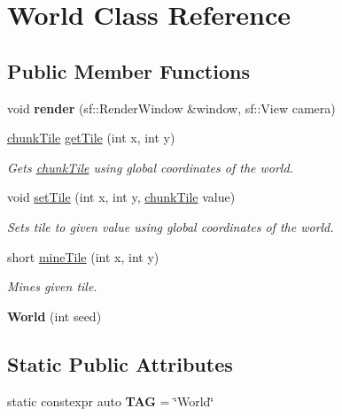 \hypertarget{classWorld}{\section{World Class Reference}
\label{classWorld}
}
\subsection*{Public Member Functions}
\begin{DoxyCompactItemize}
\item 
\hypertarget{classWorld_ad41d823a21794ad47ac4478677b0ae7f}{void {\bfseries render} (sf\-::\-Render\-Window \&window, sf\-::\-View camera)}\label{classWorld_ad41d823a21794ad47ac4478677b0ae7f}

\item 
\hypertarget{classWorld_a6bba777d3b8230e5d84333b14ff9a559}{\hyperlink{structchunkTile}{chunk\-Tile} \hyperlink{classWorld_a6bba777d3b8230e5d84333b14ff9a559}{get\-Tile} (int x, int y)}\label{classWorld_a6bba777d3b8230e5d84333b14ff9a559}

\begin{DoxyCompactList}\small\item\em Gets \hyperlink{structchunkTile}{chunk\-Tile} using global coordinates of the world. \end{DoxyCompactList}\item 
\hypertarget{classWorld_a7d1aeeafb60622886696ac01d7cbef34}{void \hyperlink{classWorld_a7d1aeeafb60622886696ac01d7cbef34}{set\-Tile} (int x, int y, \hyperlink{structchunkTile}{chunk\-Tile} value)}\label{classWorld_a7d1aeeafb60622886696ac01d7cbef34}

\begin{DoxyCompactList}\small\item\em Sets tile to given value using global coordinates of the world. \end{DoxyCompactList}\item 
short \hyperlink{classWorld_a1bbfac1b517a991c30aa96b57d04d265}{mine\-Tile} (int x, int y)
\begin{DoxyCompactList}\small\item\em Mines given tile. \end{DoxyCompactList}\item 
\hypertarget{classWorld_a4598832293e050abba792d1b4367a368}{{\bfseries World} (int seed)}\label{classWorld_a4598832293e050abba792d1b4367a368}

\end{DoxyCompactItemize}
\subsection*{Static Public Attributes}
\begin{DoxyCompactItemize}
\item 
\hypertarget{classWorld_a9ebf0ccc9a330d5f3e4ed8401d64e5f6}{static constexpr auto {\bfseries T\-A\-G} = \char`\"{}World\char`\"{}}\label{classWorld_a9ebf0ccc9a330d5f3e4ed8401d64e5f6}

\end{DoxyCompactItemize}


